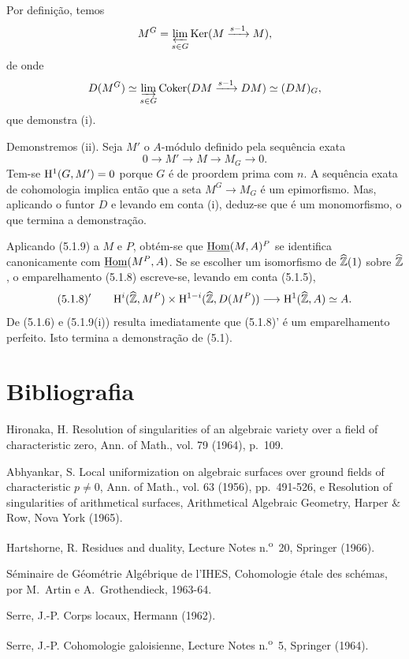 \begin{prooftext}[Demonstração]
Por definição, temos
\[
M^G=\varprojlim_{s\in G}\operatorname{Ker}(M\xrightarrow{s-1}M),
\]
de onde
\[
D(M^G)\simeq \varinjlim_{s\in G}\operatorname{Coker}(DM\xrightarrow{s-1}DM)\simeq (DM)_G,
\]
que demonstra (i).

Demonstremos (ii). Seja $M'$ o $A$-módulo definido pela sequência exata
\[
0\longrightarrow M'\longrightarrow M\longrightarrow M_G\longrightarrow0.
\]
Tem-se $\mathrm{H}^1(G,M')=0$ porque $G$ é de proordem prima com $n$. A sequência exata de cohomologia implica então que a seta $M^G\to M_G$ é um epimorfismo. Mas, aplicando o funtor $D$ e levando em conta (i), deduz-se que é um monomorfismo, o que termina a demonstração.
\end{prooftext}

Aplicando (5.1.9) a $M$ e $P$, obtém-se que $\underline{\operatorname{Hom}}(M,A)^P$ se identifica canonicamente com $\underline{\operatorname{Hom}}(M^P,A)$. Se se escolher um isomorfismo de $\widehat{\mathbb{Z}}(1)$ sobre $\widehat{\mathbb{Z}}$, o emparelhamento (5.1.8) escreve-se, levando em conta (5.1.5),
\[
(5.1.8)'\qquad \mathrm{H}^i(\widehat{\mathbb{Z}},M^P)\times\mathrm{H}^{1-i}(\widehat{\mathbb{Z}},D(M^P))\longrightarrow\mathrm{H}^1(\widehat{\mathbb{Z}},A)\simeq A.
\]
De (5.1.6) e (5.1.9(i)) resulta imediatamente que (5.1.8)' é um emparelhamento perfeito. Isto termina a demonstração de (5.1).

\section*{Bibliografia}

\begin{description}[leftmargin=2.5cm,style=nextline]
\item[{[2]}] Hironaka, H. Resolution of singularities of an algebraic variety over a field of characteristic zero, Ann. of Math., vol. 79 (1964), p.~109.
\item[{[1]}] Abhyankar, S. Local uniformization on algebraic surfaces over ground fields of characteristic $p\ne0$, Ann. of Math., vol. 63 (1956), pp.~491-526, e Resolution of singularities of arithmetical surfaces, Arithmetical Algebraic Geometry, Harper \& Row, Nova York (1965).
\item[{[H]}] Hartshorne, R. Residues and duality, Lecture Notes n.\textsuperscript{o}~20, Springer (1966).
\item[{[SGAA]}] Séminaire de Géométrie Algébrique de l'IHES, Cohomologie étale des schémas, por M.~Artin e A.~Grothendieck, 1963-64.
\item[{[CL]}] Serre, J.-P. Corps locaux, Hermann (1962).
\item[{[CG]}] Serre, J.-P. Cohomologie galoisienne, Lecture Notes n.\textsuperscript{o}~5, Springer (1964).
\end{description}
